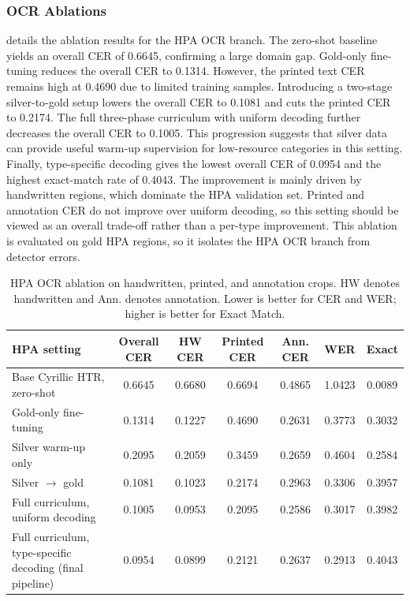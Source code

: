 \documentclass[runningheads]{llncs}
\newcommand{\metrichead}[1]{#1}
\begin{document}
\subsubsection{OCR Ablations}

 details the ablation results for the HPA OCR branch. The zero-shot baseline yields an overall CER of 0.6645, confirming a large domain gap. Gold-only fine-tuning reduces the overall CER to 0.1314. However, the printed text CER remains high at 0.4690 due to limited training samples. Introducing a two-stage silver-to-gold setup lowers the overall CER to 0.1081 and cuts the printed CER to 0.2174. The full three-phase curriculum with uniform decoding further decreases the overall CER to 0.1005. This progression suggests that silver data can provide useful warm-up supervision for low-resource categories in this setting. Finally, type-specific decoding gives the lowest overall CER of 0.0954 and the highest exact-match rate of 0.4043. The improvement is mainly driven by handwritten regions, which dominate the HPA validation set. Printed and annotation CER do not improve over uniform decoding, so this setting should be viewed as an overall trade-off rather than a per-type improvement. This ablation is evaluated on gold HPA regions, so it isolates the HPA OCR branch from detector errors.

\begin{table}[t]
  \caption{HPA OCR ablation on handwritten, printed, and annotation crops. HW denotes handwritten and Ann. denotes annotation. Lower is better for CER and WER; higher is better for Exact Match.}
  \label{tab:hpa-ablation}
  \centering
  \begingroup
  \scriptsize
  \setlength{\tabcolsep}{2.5pt}
  \renewcommand{\arraystretch}{1.05}
  \begin{tabularx}{\linewidth}{@{}Ycccccc@{}}
    \toprule
    HPA setting & \metrichead{Overall CER} & \metrichead{HW CER} & \metrichead{Printed CER} & \metrichead{Ann. CER} & \metrichead{WER} & \metrichead{Exact} \\
    \midrule
    Base Cyrillic HTR, zero-shot & 0.6645 & 0.6680 & 0.6694 & 0.4865 & 1.0423 & 0.0089 \\
    Gold-only fine-tuning & 0.1314 & 0.1227 & 0.4690 & 0.2631 & 0.3773 & 0.3032 \\
    Silver warm-up only & 0.2095 & 0.2059 & 0.3459 & 0.2659 & 0.4604 & 0.2584 \\
    Silver $\rightarrow$ gold & 0.1081 & 0.1023 & 0.2174 & 0.2963 & 0.3306 & 0.3957 \\
    Full curriculum, uniform decoding & 0.1005 & 0.0953 & 0.2095 & 0.2586 & 0.3017 & 0.3982 \\
    Full curriculum, type-specific decoding (final pipeline) & 0.0954 & 0.0899 & 0.2121 & 0.2637 & 0.2913 & 0.4043 \\
    \bottomrule
  \end{tabularx}
  \endgroup
\end{table}
\end{document}
